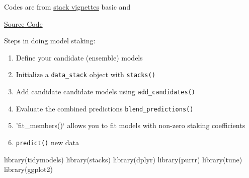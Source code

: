 \documentclass[
]{book}
\newenvironment{Shaded}{\begin{snugshade}}{\end{snugshade}}
\newcommand{\FunctionTok}[1]{\textcolor[rgb]{0.00,0.00,0.00}{#1}}
\newcommand{\NormalTok}[1]{#1}
\providecommand{\tightlist}{%
  \setlength{\itemsep}{0pt}\setlength{\parskip}{0pt}}
\begin{document}
Codes are from \href{https://cran.r-project.org/web/packages/stacks/vignettes/basics.html}{stack vignettes} basic and

\href{https://github.com/tidymodels/stacks}{Source Code}

Steps in doing model staking:

\begin{enumerate}
\def\labelenumi{\arabic{enumi}.}
\tightlist
\item
  Define your candidate (ensemble) models
\item
  Initialize a \texttt{data\_stack} object with \texttt{stacks()}
\item
  Add candidate candidate models using \texttt{add\_candidates()}
\item
  Evaluate the combined predictions \texttt{blend\_predictions()}
\item
  'fit\_members()` allows you to fit models with non-zero staking coefficients
\item
  \texttt{predict()} new data
\end{enumerate}

\begin{Shaded}
\begin{Highlighting}[]
\FunctionTok{library}\NormalTok{(tidymodels)}
\FunctionTok{library}\NormalTok{(stacks)}
\FunctionTok{library}\NormalTok{(dplyr)}
\FunctionTok{library}\NormalTok{(purrr)}
\FunctionTok{library}\NormalTok{(tune)}
\FunctionTok{library}\NormalTok{(ggplot2)}
\end{Highlighting}
\end{Shaded}
\end{document}
